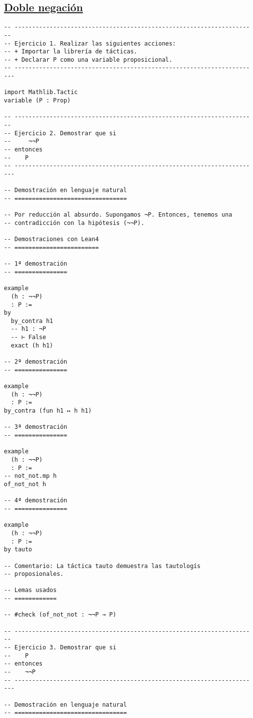 \subsection{\href{./src/Logica/Doble\_negacion.lean}{Doble negación}}
\label{sec:orgf39b28b}
\begin{verbatim}
-- ---------------------------------------------------------------------
-- Ejercicio 1. Realizar las siguientes acciones:
-- + Importar la librería de tácticas.
-- + Declarar P como una variable proposicional.
-- ----------------------------------------------------------------------

import Mathlib.Tactic
variable (P : Prop)

-- ---------------------------------------------------------------------
-- Ejercicio 2. Demostrar que si
--     ¬¬P
-- entonces
--    P
-- ----------------------------------------------------------------------

-- Demostración en lenguaje natural
-- ================================

-- Por reducción al absurdo. Supongamos ¬P. Entonces, tenemos una
-- contradicción con la hipótesis (¬¬P).

-- Demostraciones con Lean4
-- ========================

-- 1ª demostración
-- ===============

example
  (h : ¬¬P)
  : P :=
by
  by_contra h1
  -- h1 : ¬P
  -- ⊢ False
  exact (h h1)

-- 2ª demostración
-- ===============

example
  (h : ¬¬P)
  : P :=
by_contra (fun h1 ↦ h h1)

-- 3ª demostración
-- ===============

example
  (h : ¬¬P)
  : P :=
-- not_not.mp h
of_not_not h

-- 4ª demostración
-- ===============

example
  (h : ¬¬P)
  : P :=
by tauto

-- Comentario: La táctica tauto demuestra las tautologís
-- proposionales.

-- Lemas usados
-- ============

-- #check (of_not_not : ¬¬P → P)

-- ---------------------------------------------------------------------
-- Ejercicio 3. Demostrar que si
--    P
-- entonces
--    ¬¬P
-- ----------------------------------------------------------------------

-- Demostración en lenguaje natural
-- ================================


\end{verbatim}
